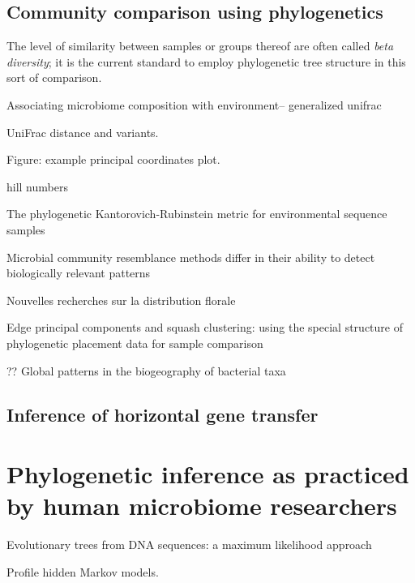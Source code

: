 \documentclass{amsart}
\begin{document}
\subsection{Community comparison using phylogenetics}

The level of similarity between samples or groups thereof are often called \emph{beta diversity}; it is the current standard to employ phylogenetic tree structure in this sort of comparison.

\cite{chen2012associating}
Associating microbiome composition with environment-- generalized unifrac

UniFrac distance and variants.
\cite{LozuponeKnightUniFrac05}
\cite{LozuponeEaWeightedUnifrac07}

Figure: example principal coordinates plot.

\cite{BikEaMicrobiotaStomach06}

hill numbers
\cite{chao2010phylogenetic}

\cite{evans2012phylogenetic}
The phylogenetic Kantorovich-Rubinstein metric for environmental sequence samples

\cite{kuczynski2010microbial}
Microbial community resemblance methods differ in their ability to detect biologically relevant patterns


\cite{jaccard1908nouvelles}
Nouvelles recherches sur la distribution florale


\cite{matsen2013edge}
Edge principal components and squash clustering: using the special structure of phylogenetic placement data for sample comparison

\cite{PurdomAnalyzingDataGraphs08}


\cite{nemergut2011global}
?? Global patterns in the biogeography of bacterial taxa

\subsection{Inference of horizontal gene transfer}




\section{Phylogenetic inference as practiced by human microbiome researchers}

\cite{felsenstein1981evolutionary}
{Evolutionary trees from DNA sequences: a maximum likelihood approach}

\cite{eddy1998profile}
Profile hidden Markov models.
\end{document}
